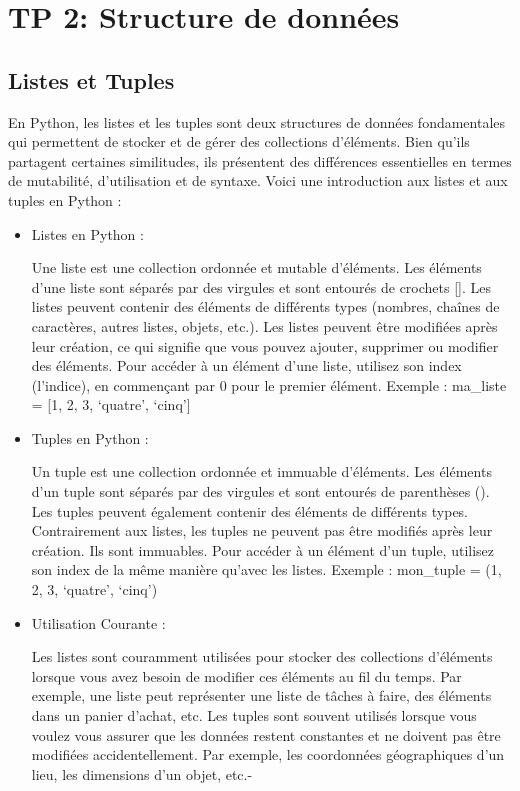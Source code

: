 \documentclass[11pt]{article}
\begin{document}
    \hypertarget{tp-2-structure-de-donnuxe9es}{%
\section{TP 2: Structure de
données}\label{tp-2-structure-de-donnuxe9es}}

\hypertarget{listes-et-tuples}{%
\subsection{Listes et Tuples}\label{listes-et-tuples}}

En Python, les listes et les tuples sont deux structures de données
fondamentales qui permettent de stocker et de gérer des collections
d'éléments. Bien qu'ils partagent certaines similitudes, ils présentent
des différences essentielles en termes de mutabilité, d'utilisation et
de syntaxe. Voici une introduction aux listes et aux tuples en Python :

\begin{itemize}
\item
  Listes en Python :

  Une liste est une collection ordonnée et mutable d'éléments. Les
  éléments d'une liste sont séparés par des virgules et sont entourés de
  crochets {[}{]}. Les listes peuvent contenir des éléments de
  différents types (nombres, chaînes de caractères, autres listes,
  objets, etc.). Les listes peuvent être modifiées après leur création,
  ce qui signifie que vous pouvez ajouter, supprimer ou modifier des
  éléments. Pour accéder à un élément d'une liste, utilisez son index
  (l'indice), en commençant par 0 pour le premier élément. Exemple :
  ma\_liste = {[}1, 2, 3, `quatre', `cinq'{]}
\item
  Tuples en Python :

  Un tuple est une collection ordonnée et immuable d'éléments. Les
  éléments d'un tuple sont séparés par des virgules et sont entourés de
  parenthèses (). Les tuples peuvent également contenir des éléments de
  différents types. Contrairement aux listes, les tuples ne peuvent pas
  être modifiés après leur création. Ils sont immuables. Pour accéder à
  un élément d'un tuple, utilisez son index de la même manière qu'avec
  les listes. Exemple : mon\_tuple = (1, 2, 3, `quatre', `cinq')
\item
  Utilisation Courante :

  Les listes sont couramment utilisées pour stocker des collections
  d'éléments lorsque vous avez besoin de modifier ces éléments au fil du
  temps. Par exemple, une liste peut représenter une liste de tâches à
  faire, des éléments dans un panier d'achat, etc. Les tuples sont
  souvent utilisés lorsque vous voulez vous assurer que les données
  restent constantes et ne doivent pas être modifiées accidentellement.
  Par exemple, les coordonnées géographiques d'un lieu, les dimensions
  d'un objet, etc.-
\end{itemize}
\end{document}
